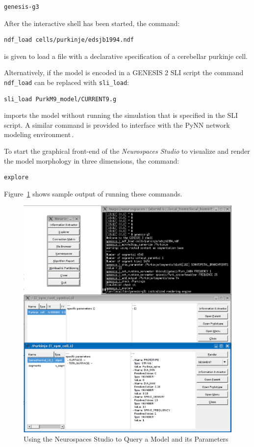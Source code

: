 \documentclass[12pt]{article}
\begin{document}
{\footnotesize
\begin{verbatim}
genesis-g3
\end{verbatim}
}

After the interactive shell has been started, the command:

{\footnotesize
\begin{verbatim}
ndf_load cells/purkinje/edsjb1994.ndf
\end{verbatim}
}

is given to load a file with a declarative specification of a
cerebellar purkinje cell.

Alternatively, if the model is encoded in a GENESIS 2 SLI script the
command {\tt ndf\_load} can be replaced with {\tt sli\_load}:

{\footnotesize
\begin{verbatim}
sli_load PurkM9_model/CURRENT9.g
\end{verbatim}
}

imports the model without running the simulation that is specified in
the SLI script.  A similar command is provided to interface with the
PyNN network modeling environment\,\cite{andrew08:_pynn}.

To start the graphical front-end of the {\it Neurospaces Studio} to
visualize and render the model morphology in three dimensions, the
command:

{\footnotesize
\begin{verbatim}
explore
\end{verbatim}
}

Figure~\ref{fig:cbi-studio} shows sample output of running these
commands.

\begin{figure}[ht]
  \centering
  \includegraphics[scale=0.3]{figures/studio-screenshot.eps}
  \caption{Using the Neurospaces Studio to Query a Model and its
    Parameters}
  \label{fig:cbi-studio}
\end{figure}
\end{document}
